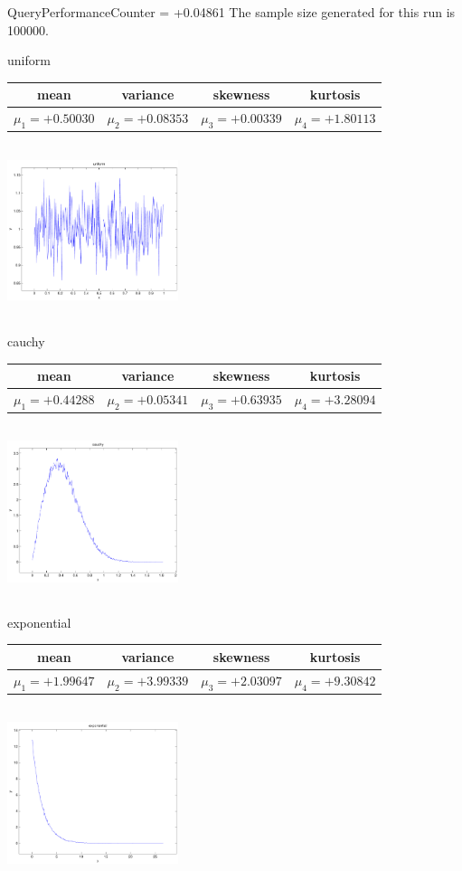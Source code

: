 \documentclass[9pt]{article}
\theoremstyle{plain}
\theoremstyle{definition}
\theoremstyle{remark}
\numberwithin{equation}{section}
\begin{document}
QueryPerformanceCounter  =  +0.04861
The sample size generated for this run is 100000.

\newpage
uniform \begin{tabular}{|c|c|c|c|}  mean & variance & skewness & kurtosis \\  \hline
$\mu_1 = +0.50030$ & $\mu_2 = +0.08353$ & $\mu_3 = +0.00339$ & $\mu_4 =+1.80113$ \\
\end{tabular}

\includegraphics[width=5cm,height=5cm]{uniform.pdf}

cauchy \begin{tabular}{|c|c|c|c|}  mean & variance & skewness & kurtosis \\  \hline
$\mu_1 = +0.44288$ & $\mu_2 = +0.05341$ & $\mu_3 = +0.63935$ & $\mu_4 =+3.28094$ \\
\end{tabular}

\includegraphics[width=5cm,height=5cm]{cauchy.pdf}

exponential \begin{tabular}{|c|c|c|c|}  mean & variance & skewness & kurtosis \\  \hline
$\mu_1 = +1.99647$ & $\mu_2 = +3.99339$ & $\mu_3 = +2.03097$ & $\mu_4 =+9.30842$ \\
\end{tabular}

\includegraphics[width=5cm,height=5cm]{exponential.pdf}
\end{document}
